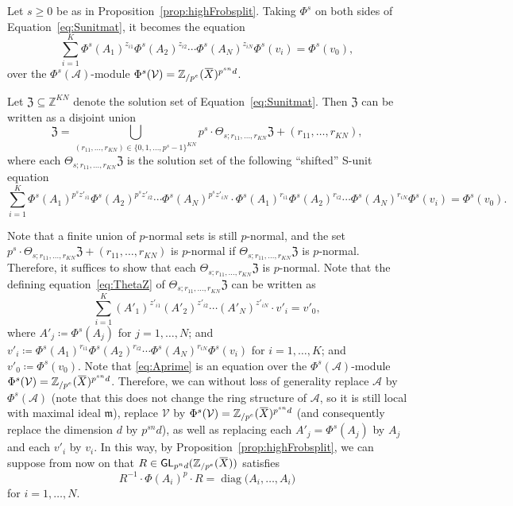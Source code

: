 \documentclass[letterpaper, 11pt, thm-restate]{article}
\numberwithin{equation}{section}
\newcommand{\Z}{\mathbb{Z}}
\newcommand{\Zpe}{\mathbb{Z}_{/p^e}}
\newcommand{\GL}{\mathsf{GL}}
\newcommand{\diag}{\operatorname{diag}}
\newcommand{\mV}{\mathcal{V}}
\newcommand{\mA}{\mathcal{A}}
\newcommand{\mZ}{\mathfrak{Z}}
\newcommand{\oX}{\mkern 1.5mu\overline{\mkern-1.5mu X \mkern-1.5mu}\mkern 1.5mu}
\newcommand{\frm}{\mathfrak{m}}
\theoremstyle{definition}
\theoremstyle{definition}
\theoremstyle{definition}
\begin{document}
Let $s \geq 0$ be as in Proposition~\ref{prop:highFrobsplit}. Taking $\Phi^s$ on both sides of Equation~\eqref{eq:Sunitmat}, it becomes the equation
\begin{equation}\label{eq:goalPhiAv}
    \sum_{i = 1}^K \Phi^s(A_1)^{z_{i1}} \Phi^s(A_2)^{z_{i2}} \cdots \Phi^s(A_N)^{z_{iN}} \Phi^s(v_i) = \Phi^s(v_0),
\end{equation}
over the $\Phi^s(\mA)$-module $\Phi^s(\mV) = \Zpe(\oX)^{p^{sn}d}$.

Let $\mZ \subseteq \Z^{KN}$ denote the solution set of Equation~\eqref{eq:Sunitmat}.
Then $\mZ$ can be written as a disjoint union 
\[
\mZ = \bigcup_{(r_{11}, \ldots, r_{KN}) \in \{0, 1, \ldots, p^s-1\}^{KN}} p^s \cdot \Theta_{s; r_{11}, \ldots, r_{KN}} \mZ + (r_{11}, \ldots, r_{KN}),
\]
where each $\Theta_{s; r_{11}, \ldots, r_{KN}} \mZ$ is the solution set of the following ``shifted'' S-unit equation
\begin{equation}\label{eq:ThetaZ}
\sum_{i = 1}^K \Phi^s(A_1)^{p^sz'_{i1}} \Phi^s(A_2)^{p^s z'_{i2}} \cdots \Phi^s(A_N)^{p^s z'_{iN}} \cdot \Phi^s(A_1)^{r_{i1}} \Phi^s(A_2)^{r_{i2}} \cdots \Phi^s(A_N)^{r_{iN}} \Phi^s(v_i) = \Phi^s(v_0).
\end{equation}

Note that a finite union of $p$-normal sets is still $p$-normal, and the set $p^s \cdot \Theta_{s; r_{11}, \ldots, r_{KN}} \mZ + (r_{11}, \ldots, r_{KN})$ is $p$-normal if $\Theta_{s; r_{11}, \ldots, r_{KN}} \mZ$ is $p$-normal.
Therefore, it suffices to show that each $\Theta_{s; r_{11}, \ldots, r_{KN}} \mZ$ is $p$-normal.
Note that the defining equation~\eqref{eq:ThetaZ} of $\Theta_{s; r_{11}, \ldots, r_{KN}} \mZ$ can be written as
\begin{equation}\label{eq:Aprime}
    \sum_{i = 1}^K \left(A'_1\right)^{z'_{i1}} \left(A'_2\right)^{z'_{i2}} \cdots \left(A'_N\right)^{z'_{iN}} \cdot v'_i = v'_0,
\end{equation}
where $A'_j \coloneqq \Phi^s(A_j)$ for $j = 1, \ldots, N$; and $v'_i \coloneqq \Phi^s(A_1)^{r_{i1}} \Phi^s(A_2)^{r_{i2}} \cdots \Phi^s(A_N)^{r_{iN}} \Phi^s(v_i)$ for $i = 1, \ldots, K$; and $v'_0 \coloneqq \Phi^s(v_0)$.
Note that \eqref{eq:Aprime} is an equation over the $\Phi^s(\mA)$-module $\Phi^s(\mV) = \Zpe(\oX)^{p^{sn}d}$.
Therefore, we can without loss of generality replace $\mA$ by $\Phi^s(\mA)$ (note that this does not change the ring structure of $\mA$, so it is still local with maximal ideal $\frm$), replace $\mV$ by $\Phi^s(\mV) = \Zpe(\oX)^{p^{sn}d}$ (and consequently replace the dimension $d$ by $p^{sn}d$), as well as replacing each $A'_j = \Phi^s(A_j)$ by $A_j$ and each $v'_i$ by $v_i$.
In this way, by Proposition~\ref{prop:highFrobsplit}, we can suppose from now on that $R \in \GL_{p^nd}(\Zpe(\oX))$ satisfies
\begin{equation}\label{eq:assumeFrob}
    R^{-1} \cdot \Phi(A_i)^{p} \cdot R = \diag\big(A_i, \ldots, A_i\big)
\end{equation}
for $i = 1, \ldots, N$.
\end{document}
